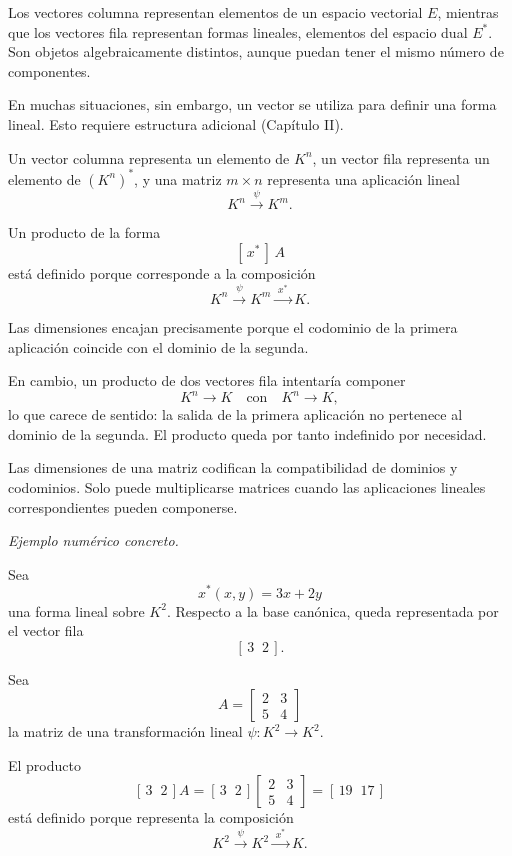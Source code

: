 Los vectores columna representan elementos de un espacio vectorial $E$, mientras que los vectores fila representan formas lineales, elementos del espacio dual $E^*$. Son objetos algebraicamente distintos, aunque puedan tener el mismo número de componentes.

\medskip

En muchas situaciones, sin embargo, un vector se utiliza para definir una forma lineal. Esto requiere estructura adicional (Capítulo II).

Un vector columna representa un elemento de $K^n$, un vector fila representa un elemento de $(K^n)^*$, y una matriz $m\times n$ representa una aplicación lineal
\[
K^n \xrightarrow{\;\psi\;} K^m.
\]

Un producto de la forma
\[
[\,x^*\,]\,A
\]
está definido porque corresponde a la composición
\[
K^n \xrightarrow{\;\psi\;} K^m \xrightarrow{\;x^*\;} K.
\]

Las dimensiones encajan precisamente porque el codominio de la primera aplicación coincide con el dominio de la segunda.

\medskip

En cambio, un producto de dos vectores fila intentaría componer
\[
K^n \to K
\quad\text{con}\quad
K^n \to K,
\]
lo que carece de sentido: la salida de la primera aplicación no pertenece al dominio de la segunda. El producto queda por tanto indefinido por necesidad.

\medskip

Las dimensiones de una matriz codifican la compatibilidad de dominios y codominios. Solo puede multiplicarse matrices cuando las aplicaciones lineales correspondientes pueden componerse.

\medskip

\textit{Ejemplo numérico concreto.}

Sea
\[
x^*(x,y)=3x+2y
\]
una forma lineal sobre $K^2$. Respecto a la base canónica, queda representada por el vector fila
\[
[\,3\;\;2\,].
\]

Sea
\[
A=
\begin{bmatrix}
2 & 3\\
5 & 4
\end{bmatrix}
\]
la matriz de una transformación lineal
\(
\psi:K^2\to K^2.
\)

El producto
\[
[\,3\;\;2\,]A
=
[\,3\;\;2\,]
\begin{bmatrix}
2 & 3\\
5 & 4
\end{bmatrix}
=
[\,19\;\;17\,]
\]
está definido porque representa la composición
\[
K^2 \xrightarrow{\;\psi\;} K^2 \xrightarrow{\;x^*\;} K.
\]

